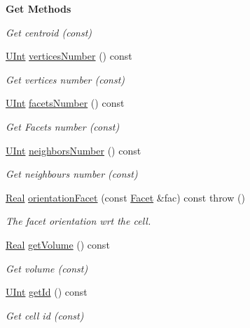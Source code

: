 \begin{Indent}{\bf Get Methods}
\begin{DoxyCompactItemize}
\begin{DoxyCompactList}\small\item\em Get centroid (const) \end{DoxyCompactList}\item 
\hyperlink{namespaceFVCode3D_a4bf7e328c75d0fd504050d040ebe9eda}{U\+Int} \hyperlink{classFVCode3D_1_1Rigid__Mesh_1_1Cell_a49bd64356c70bb4280bf311a003362d3}{vertices\+Number} () const 
\begin{DoxyCompactList}\small\item\em Get vertices number (const) \end{DoxyCompactList}\item 
\hyperlink{namespaceFVCode3D_a4bf7e328c75d0fd504050d040ebe9eda}{U\+Int} \hyperlink{classFVCode3D_1_1Rigid__Mesh_1_1Cell_a62007c851baca0208f3b3a2b5924071c}{facets\+Number} () const 
\begin{DoxyCompactList}\small\item\em Get Facets number (const) \end{DoxyCompactList}\item 
\hyperlink{namespaceFVCode3D_a4bf7e328c75d0fd504050d040ebe9eda}{U\+Int} \hyperlink{classFVCode3D_1_1Rigid__Mesh_1_1Cell_a7565670461e8f87193816f70390bf645}{neighbors\+Number} () const 
\begin{DoxyCompactList}\small\item\em Get neighbours number (const) \end{DoxyCompactList}\item 
\hyperlink{namespaceFVCode3D_a40c1f5588a248569d80aa5f867080e83}{Real} \hyperlink{classFVCode3D_1_1Rigid__Mesh_1_1Cell_a7ded24addbc6c535d7e3da6617e23c7c}{orientation\+Facet} (const \hyperlink{classFVCode3D_1_1Rigid__Mesh_1_1Facet}{Facet} \&fac) const   throw ()
\begin{DoxyCompactList}\small\item\em The facet orientation wrt the cell. \end{DoxyCompactList}\item 
\hyperlink{namespaceFVCode3D_a40c1f5588a248569d80aa5f867080e83}{Real} \hyperlink{classFVCode3D_1_1Rigid__Mesh_1_1Cell_a60b0f29d67c90d2f8718b15a76885894}{get\+Volume} () const 
\begin{DoxyCompactList}\small\item\em Get volume (const) \end{DoxyCompactList}\item 
\hyperlink{namespaceFVCode3D_a4bf7e328c75d0fd504050d040ebe9eda}{U\+Int} \hyperlink{classFVCode3D_1_1Rigid__Mesh_1_1Cell_a2d86bd17fac84a6e521c8606cc8aeaaf}{get\+Id} () const 
\begin{DoxyCompactList}\small\item\em Get cell id (const) \end{DoxyCompactList}\end{DoxyCompactItemize}
\end{Indent}
